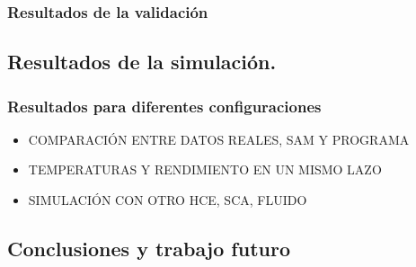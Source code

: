 \documentclass[11pt]{article}
\makeatletter
\providecommand{\tightlist}{%
      \setlength{\itemsep}{0pt}\setlength{\parskip}{0pt}}
\newcommand{\boxspacing}{\kern\kvtcb@left@rule\kern\kvtcb@boxsep}
\newcommand{\prompt}[4]{
        \ttfamily\llap{{\color{#2}[#3]:\hspace{3pt}#4}}\vspace{-\baselineskip}
    }
\makeatother
\begin{document}
\hypertarget{resultados-de-la-validaciuxf3n}{%
\subsubsection{Resultados de la
validación}\label{resultados-de-la-validaciuxf3n}}

    \hypertarget{resultados-de-la-simulaciuxf3n.}{%
\subsection{Resultados de la
simulación.}\label{resultados-de-la-simulaciuxf3n.}}

\hypertarget{resultados-para-diferentes-configuraciones}{%
\subsubsection{Resultados para diferentes
configuraciones}\label{resultados-para-diferentes-configuraciones}}

\begin{itemize}
\tightlist
\item
  COMPARACIÓN ENTRE DATOS REALES, SAM Y PROGRAMA
\item
  TEMPERATURAS Y RENDIMIENTO EN UN MISMO LAZO
\item
  SIMULACIÓN CON OTRO HCE, SCA, FLUIDO
\end{itemize}

\hypertarget{conclusiones-y-trabajo-futuro}{%
\subsection{Conclusiones y trabajo
futuro}\label{conclusiones-y-trabajo-futuro}}

    

    \begin{tcolorbox}[breakable, size=fbox, boxrule=1pt, pad at break*=1mm,colback=cellbackground, colframe=cellborder]
\prompt{In}{incolor}{ }{\boxspacing}
\begin{Verbatim}[commandchars=\\\{\}]

\end{Verbatim}
\end{tcolorbox}


    
    
    
\end{document}
